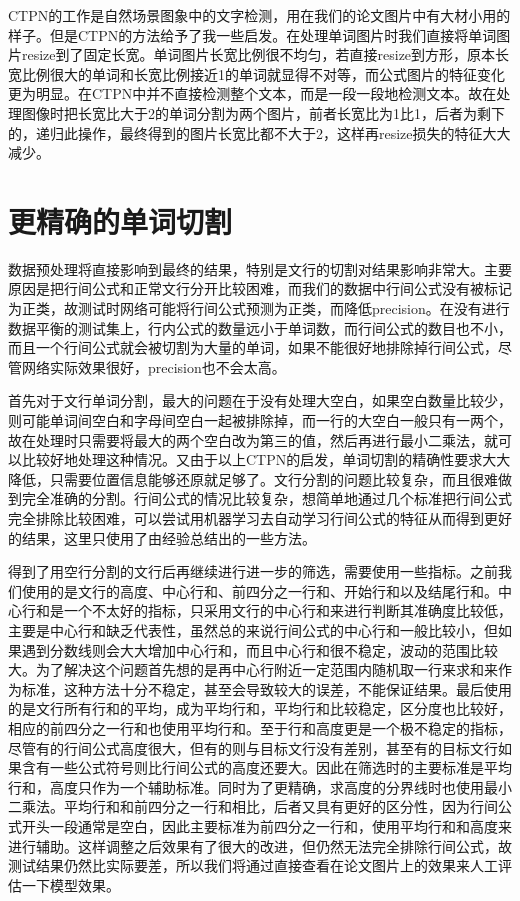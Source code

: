 CTPN的工作是自然场景图象中的文字检测，用在我们的论文图片中有大材小用的样子。但是CTPN的方法给予了我一些启发。在处理单词图片时我们直接将单词图片resize到了固定长宽。单词图片长宽比例很不均匀，若直接resize到方形，原本长宽比例很大的单词和长宽比例接近1的单词就显得不对等，而公式图片的特征变化更为明显。在CTPN中并不直接检测整个文本，而是一段一段地检测文本。故在处理图像时把长宽比大于2的单词分割为两个图片，前者长宽比为1比1，后者为剩下的，递归此操作，最终得到的图片长宽比都不大于2，这样再resize损失的特征大大减少。

\section{更精确的单词切割}

数据预处理将直接影响到最终的结果，特别是文行的切割对结果影响非常大。主要原因是把行间公式和正常文行分开比较困难，而我们的数据中行间公式没有被标记为正类，故测试时网络可能将行间公式预测为正类，而降低precision。在没有进行数据平衡的测试集上，行内公式的数量远小于单词数，而行间公式的数目也不小，而且一个行间公式就会被切割为大量的单词，如果不能很好地排除掉行间公式，尽管网络实际效果很好，precision也不会太高。

首先对于文行单词分割，最大的问题在于没有处理大空白，如果空白数量比较少，则可能单词间空白和字母间空白一起被排除掉，而一行的大空白一般只有一两个，故在处理时只需要将最大的两个空白改为第三的值，然后再进行最小二乘法，就可以比较好地处理这种情况。又由于以上CTPN的启发，单词切割的精确性要求大大降低，只需要位置信息能够还原就足够了。文行分割的问题比较复杂，而且很难做到完全准确的分割。行间公式的情况比较复杂，想简单地通过几个标准把行间公式完全排除比较困难，可以尝试用机器学习去自动学习行间公式的特征从而得到更好的结果，这里只使用了由经验总结出的一些方法。

得到了用空行分割的文行后再继续进行进一步的筛选，需要使用一些指标。之前我们使用的是文行的高度、中心行和、前四分之一行和、开始行和以及结尾行和。中心行和是一个不太好的指标，只采用文行的中心行和来进行判断其准确度比较低，主要是中心行和缺乏代表性，虽然总的来说行间公式的中心行和一般比较小，但如果遇到分数线则会大大增加中心行和，而且中心行和很不稳定，波动的范围比较大。为了解决这个问题首先想的是再中心行附近一定范围内随机取一行来求和来作为标准，这种方法十分不稳定，甚至会导致较大的误差，不能保证结果。最后使用的是文行所有行和的平均，成为平均行和，平均行和比较稳定，区分度也比较好，相应的前四分之一行和也使用平均行和。至于行和高度更是一个极不稳定的指标，尽管有的行间公式高度很大，但有的则与目标文行没有差别，甚至有的目标文行如果含有一些公式符号则比行间公式的高度还要大。因此在筛选时的主要标准是平均行和，高度只作为一个辅助标准。同时为了更精确，求高度的分界线时也使用最小二乘法。平均行和和前四分之一行和相比，后者又具有更好的区分性，因为行间公式开头一段通常是空白，因此主要标准为前四分之一行和，使用平均行和和高度来进行辅助。这样调整之后效果有了很大的改进，但仍然无法完全排除行间公式，故测试结果仍然比实际要差，所以我们将通过直接查看在论文图片上的效果来人工评估一下模型效果。

